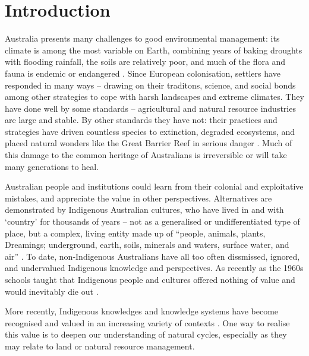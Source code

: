 \chapter{Introduction}
\label{ch:introduction}

Australia presents many challenges to good environmental management: its
climate is among the most variable on Earth, combining years of baking
droughts with flooding rainfall, the soils are relatively poor, and much of
the flora and fauna is endemic or endangered \citep{davies1999}.
%
Since European colonisation, settlers have responded in many ways --
drawing on their traditons, science, and social bonds among other strategies to cope
with harsh landscapes and extreme climates.
%
They have done well by some standards -- agricultural and natural
resource industries are large and stable.  By other standards they have not:
their practices and strategies have driven countless species to extinction,
degraded ecosystems, and placed natural wonders like the Great Barrier Reef
in serious danger \citep{flannery1994}.  Much of this damage to the common heritage of Australians
is irreversible or will take many generations to heal.

Australian people and institutions could learn from their colonial and exploitative mistakes,
and appreciate the value in other perspectives.  Alternatives are demonstrated
by Indigenous Australian cultures, who have lived in and with `country' for
thousands of years -- not as a generalised or undifferentiated
type of place, but a complex, living entity made up of ``people, animals,
plants, Dreamings; underground, earth, soils, minerals and waters, surface
water, and air'' \citep[][p7]{birdrose1996}.
%
To date, non-Indigenous Australians
have all too often dissmissed, ignored, and undervalued Indigenous knowledge
and perspectives.  As recently as the 1960s schools taught that Indigenous
people and cultures offered nothing of value and would inevitably die out
\citep{flannery1994}.


More recently, Indigenous knowledges and knowledge systems have become recognised and valued in an
increasing variety of contexts \citep[eg.][]{petheram2010,cochran2015,
berkes2012}.  One way to realise this value is to deepen our understanding
of natural cycles, especially as they may relate to land or natural resource
management.


